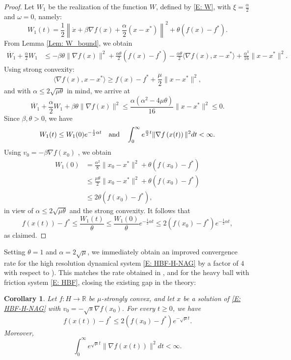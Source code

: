 \documentclass[pdflatex,sn-mathphys-num]{sn-jnl}
\theoremstyle{thmstyleone}
\newtheorem{corollary}[theorem]{Corollary}
\theoremstyle{thmstyletwo}
\theoremstyle{thmstylethree}
\newcommand{\qbox}[1]{\quad\hbox{#1}\quad}
\begin{document}
\begin{proof}
Let $W_1$ be the realization of the function $W$, defined by \eqref{E: W}, with $\xi=\frac{\alpha}{2}$ and $\omega=0$, namely:
$$W_1(t) = \frac{1}{2} \left\| \dot{x} + \beta\nabla f(x) + \frac{\alpha}{2}( x - x^* ) \right\|^2 + \theta ( f(x) - f^* ).$$
From Lemma \ref{Lem: W_bound}, we obtain
\begin{align*}
\dot{W_1} + \frac{\alpha}{2}W_1 
&\le -\beta\theta\| \nabla f(x) \|^2 
  + \frac{\alpha\theta}{2} (f(x)-f^*)
  - \frac{\alpha\theta}{2} \langle\nabla f(x),x-x^* \rangle 
  + \frac{\alpha^3}{16}\|x-x^*\|^2.
\end{align*} 
Using strong convexity:
$$ \langle\nabla f(x),x-x^* \rangle \ge f(x)-f^* + \frac{\mu}{2}\|x-x^*\|^2,$$
and with $\alpha\le2\sqrt{\mu\theta}$ in mind, we arrive at
$$ \dot{W_1} + \frac{\alpha}{2}W_1 + \beta\theta\| \nabla f(x) \|^2 
\le \frac{\alpha (\alpha^2 - 4\mu\theta)}{16}\|x-x^*\|^2
\le 0. $$
Since $\beta,\theta>0$, we have 
$$ W_1(t)\le W_1(0)e^{-\frac{1}{2}\alpha t} \qbox{and} \int_0^{\infty} e^{\frac{\alpha}{2}t}\| \nabla f\left(x(t)\right) \|^2 dt < \infty. $$
Using $v_0 = -\beta\nabla f(x_0)$ , we obtain
\begin{align*}
W_1(0) 
&= \frac{\alpha^2}{8}\| x_0 - x^* \|^2 + \theta \left( f(x_0) - f^* \right)\\
&\le \frac{\mu\theta}{2}\| x_0 - x^* \|^2 + \theta \left( f(x_0) - f^* \right) \\
&\le 2\theta \left( f(x_0) - f^* \right),
\end{align*}
in view of $\alpha\le2\sqrt{\mu\theta}$ and the strong convexity. It follows that
$$ f\left(x(t) \right) - f^* \le \frac{W_1(t)}{\theta} \le \frac{W_1(0)}{\theta}e^{-\frac{1}{2}\alpha t} \le 2 \left( f(x_0) - f^* \right) e^{-\frac{1}{2}\alpha t}, $$
as claimed.
\end{proof}

Setting $\theta=1$ and $\alpha = 2\sqrt{\mu}$, we  immediately obtain an improved convergence rate for the high resolution dynamical system \eqref{E: HBF-H-NAG} by a factor of $4$ with respect to \cite{Shi_2022}). This matches the rate obtained in \cite[Theorem 1]{Siegel_2019}, \cite[Proposition 3]{Jordan_2021} and \cite[Theorem 7]{Attouch_2022} for the heavy ball with friction system \eqref{E: HBF}, closing the existing gap in the theory:

\begin{corollary}
Let $f:H\to\mathbb{R}$ be $\mu$-strongly convex, and let $x$ be a solution of \eqref{E: HBF-H-NAG} with $v_0 = -\sqrt{s}\nabla f(x_0)$. For every $t\ge 0$, we have
$$f\left( x(t) \right) - f^* \le 2 \left( f(x_0) - f^* \right) e^{-\sqrt{\mu}t}.$$
Moreover, 
$$ \int_0^{\infty} e^{\sqrt{\mu}t}\| \nabla f\left(x(t)\right) \|^2 dt < \infty. $$    
\end{corollary}
\end{document}
